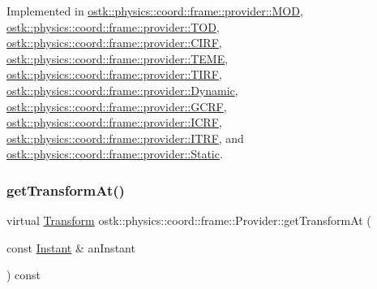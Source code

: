 Implemented in \hyperlink{classostk_1_1physics_1_1coord_1_1frame_1_1provider_1_1_m_o_d_ac7d8c3c340359b0bf13728aa93d285e4}{ostk\+::physics\+::coord\+::frame\+::provider\+::\+M\+OD}, \hyperlink{classostk_1_1physics_1_1coord_1_1frame_1_1provider_1_1_t_o_d_ad374cdce01f5872311b61695502dd4e4}{ostk\+::physics\+::coord\+::frame\+::provider\+::\+T\+OD}, \hyperlink{classostk_1_1physics_1_1coord_1_1frame_1_1provider_1_1_c_i_r_f_a9c7c1e79785b676501e6a4686389a425}{ostk\+::physics\+::coord\+::frame\+::provider\+::\+C\+I\+RF}, \hyperlink{classostk_1_1physics_1_1coord_1_1frame_1_1provider_1_1_t_e_m_e_a10031d843340adafe7d9f4a3a0a4f86c}{ostk\+::physics\+::coord\+::frame\+::provider\+::\+T\+E\+ME}, \hyperlink{classostk_1_1physics_1_1coord_1_1frame_1_1provider_1_1_t_i_r_f_ae29e3db5bd1bccbc69a507f8716b73e5}{ostk\+::physics\+::coord\+::frame\+::provider\+::\+T\+I\+RF}, \hyperlink{classostk_1_1physics_1_1coord_1_1frame_1_1provider_1_1_dynamic_a37623142581671606ea45ca3bda0d0c8}{ostk\+::physics\+::coord\+::frame\+::provider\+::\+Dynamic}, \hyperlink{classostk_1_1physics_1_1coord_1_1frame_1_1provider_1_1_g_c_r_f_a71f14cba2d0d20a5bbeaa3b4fb08a79a}{ostk\+::physics\+::coord\+::frame\+::provider\+::\+G\+C\+RF}, \hyperlink{classostk_1_1physics_1_1coord_1_1frame_1_1provider_1_1_i_c_r_f_a40f7812d39719db68178ab6850a5cdde}{ostk\+::physics\+::coord\+::frame\+::provider\+::\+I\+C\+RF}, \hyperlink{classostk_1_1physics_1_1coord_1_1frame_1_1provider_1_1_i_t_r_f_aad7e29329b68f264bed571bf48b902a4}{ostk\+::physics\+::coord\+::frame\+::provider\+::\+I\+T\+RF}, and \hyperlink{classostk_1_1physics_1_1coord_1_1frame_1_1provider_1_1_static_a3e25a6fc979fc4ac28d8cbea4835ea71}{ostk\+::physics\+::coord\+::frame\+::provider\+::\+Static}.

\mbox{\label{classostk_1_1physics_1_1coord_1_1frame_1_1_provider_a38b86a589f46f8b8a9c97ab2776f37d1}} 
\subsubsection{\texorpdfstring{get\+Transform\+At()}{getTransformAt()}}
{\footnotesize\ttfamily virtual \hyperlink{classostk_1_1physics_1_1coord_1_1_transform}{Transform} ostk\+::physics\+::coord\+::frame\+::\+Provider\+::get\+Transform\+At (\begin{DoxyParamCaption}\item[{const \hyperlink{classostk_1_1physics_1_1time_1_1_instant}{Instant} \&}]{an\+Instant }\end{DoxyParamCaption}) const\hspace{0.3cm}{\ttfamily [pure virtual]}}



